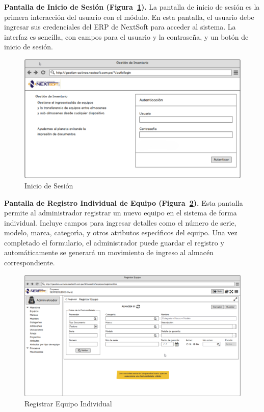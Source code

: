 \documentclass[stu, 12pt, letterpaper, donotrepeattitle, floatsintext, natbib]{apa7}
\begin{document}
\textbf{Pantalla de Inicio de Sesi\'on (Figura~\ref{login}). }La pantalla de inicio de sesi\'on es la primera interacci\'on del usuario con el m\'odulo. En esta pantalla, el usuario debe ingresar sus credenciales del ERP de NextSoft para acceder al sistema. La interfaz es sencilla, con campos para el usuario y la contrase\~{n}a, y un bot\'on de inicio de sesi\'on.
\begin{figure}[H]
    \centering
    \caption{Inicio de Sesi\'on}\label{login}
    \includegraphics[width=16.5cm, angle=0]{./images/login.png}
\end{figure}
\textbf{Pantalla de Registro Individual de Equipo (Figura~\ref{individual}). }Esta pantalla permite al administrador registrar un nuevo equipo en el sistema de forma individual. Incluye campos para ingresar detalles como el n\'umero de serie, modelo, marca, categor\'{\i}a, y otros atributos espec\'{\i}ficos del equipo. Una vez completado el formulario, el administrador puede guardar el registro y autom\'aticamente se generar\'a un movimiento de ingreso al almac\'en correspondiente.
\begin{figure}[H]
    \centering
    \caption{Registrar Equipo Individual}\label{individual}
    \includegraphics[width=16.5cm, angle=0]{./images/registroIndividual.png}
\end{figure}
\end{document}
